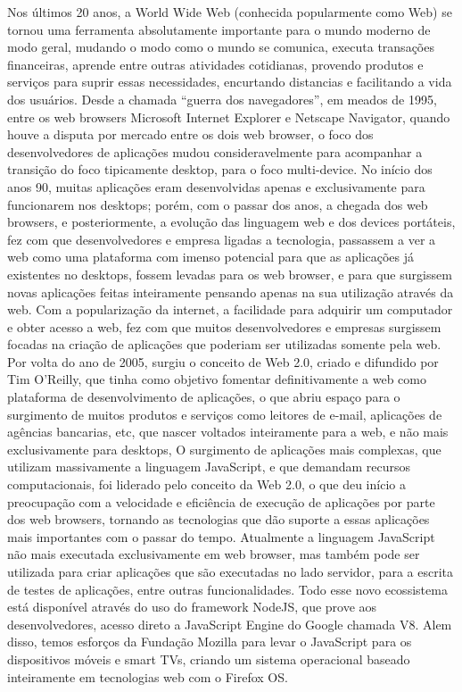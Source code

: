 \documentclass{article}
\begin{document}
Nos últimos 20 anos, a World Wide Web (conhecida popularmente como Web) se tornou
uma ferramenta absolutamente importante para o mundo moderno de modo geral, mudando
o modo como o mundo se comunica, executa transações financeiras, aprende entre outras
atividades cotidianas, provendo produtos e serviços para suprir essas necessidades,
encurtando distancias e facilitando a vida dos usuários. Desde a chamada “guerra dos
navegadores”, em meados de 1995, entre os web browsers Microsoft Internet Explorer e
Netscape Navigator, quando houve a disputa por mercado entre os dois web browser, o foco
dos desenvolvedores de aplicações mudou consideravelmente para acompanhar a transição
do foco tipicamente desktop, para o foco multi-device.
No início dos anos 90, muitas aplicações eram desenvolvidas apenas e exclusivamente para
funcionarem nos desktops; porém, com o passar dos anos, a chegada dos web browsers, e
posteriormente, a evolução das linguagem web e dos devices portáteis, fez com que
desenvolvedores e empresa ligadas a tecnologia, passassem a ver a web como uma
plataforma com imenso potencial para que as aplicações já existentes no desktops, fossem
levadas para os web browser, e para que surgissem novas aplicações feitas inteiramente
pensando apenas na sua utilização através da web.
Com a popularização da internet, a facilidade para adquirir um computador e obter acesso a
web, fez com que muitos desenvolvedores e empresas surgissem focadas na criação de
aplicações que poderiam ser utilizadas somente pela web. Por volta do ano de 2005, surgiu
o conceito de Web 2.0, criado e difundido por Tim O'Reilly, que tinha como objetivo fomentar
definitivamente a web como plataforma de desenvolvimento de aplicações, o que abriu
espaço para o surgimento de muitos produtos e serviços como leitores de e-mail, aplicações
de agências bancarias, etc, que nascer voltados inteiramente para a web, e não mais
exclusivamente para desktops,
O surgimento de aplicações mais complexas, que utilizam massivamente a linguagem
JavaScript, e que demandam recursos computacionais, foi liderado pelo conceito da Web
2.0, o que deu início a preocupação com a velocidade e eficiência de execução de
aplicações por parte dos web browsers, tornando as tecnologias que dão suporte a essas
aplicações mais importantes com o passar do tempo.
Atualmente a linguagem JavaScript não mais executada exclusivamente em web browser,
mas também pode ser utilizada para criar aplicações que são executadas no lado servidor,
para a escrita de testes de aplicações, entre outras funcionalidades. Todo esse novo
ecossistema está disponível através do uso do framework NodeJS, que prove aos
desenvolvedores, acesso direto a JavaScript Engine do Google chamada V8. Alem disso,
temos esforços da Fundação Mozilla para levar o JavaScript para os dispositivos móveis e
smart TVs, criando um sistema operacional baseado inteiramente em tecnologias web com o
Firefox OS.
\end{document}
